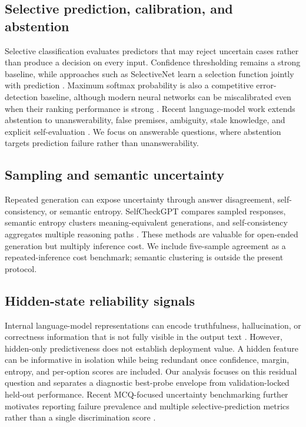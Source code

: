 \documentclass[preprint,12pt,authoryear]{elsarticle}
\begin{document}
\subsection{Selective prediction, calibration, and abstention}
Selective classification evaluates predictors that may reject uncertain cases rather than produce a decision on every input. Confidence thresholding remains a strong baseline, while approaches such as SelectiveNet learn a selection function jointly with prediction \citep{geifman2017selective,geifman2019selectivenet}. Maximum softmax probability is also a competitive error-detection baseline, although modern neural networks can be miscalibrated even when their ranking performance is strong \citep{hendrycks2017baseline,guo2017calibration}. Recent language-model work extends abstention to unanswerability, false premises, ambiguity, stale knowledge, and explicit self-evaluation \citep{wen2025limits,kirichenko2025abstentionbench,kadavath2022lmknow}. We focus on answerable questions, where abstention targets prediction failure rather than unanswerability.

\subsection{Sampling and semantic uncertainty}
Repeated generation can expose uncertainty through answer disagreement, self-consistency, or semantic entropy. SelfCheckGPT compares sampled responses, semantic entropy clusters meaning-equivalent generations, and self-consistency aggregates multiple reasoning paths \citep{manakul2023selfcheckgpt,farquhar2024semanticentropy,wang2023selfconsistency}. These methods are valuable for open-ended generation but multiply inference cost. We include five-sample agreement as a repeated-inference cost benchmark; semantic clustering is outside the present protocol.

\subsection{Hidden-state reliability signals}
Internal language-model representations can encode truthfulness, hallucination, or correctness information that is not fully visible in the output text \citep{chen2024inside,ji2024internal,orgad2024llms}. However, hidden-only predictiveness does not establish deployment value. A hidden feature can be informative in isolation while being redundant once confidence, margin, entropy, and per-option scores are included. Our analysis focuses on this residual question and separates a diagnostic best-probe envelope from validation-locked held-out performance. Recent MCQ-focused uncertainty benchmarking further motivates reporting failure prevalence and multiple selective-prediction metrics rather than a single discrimination score \citep{wang2025ubench}.
\end{document}
